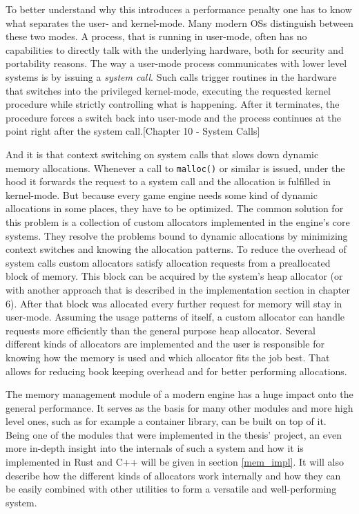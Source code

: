 To better understand why this introduces a performance penalty one has to know what separates the user- and kernel-mode. Many modern \acp{OS} distinguish between these two modes. A process, that is running in user-mode, often has no capabilities to directly talk with the underlying hardware, both for security and portability reasons. The way a user-mode process communicates with lower level systems is by issuing a \textit{system call}. Such calls trigger routines in the hardware that switches into the privileged kernel-mode, executing the requested kernel procedure while strictly controlling what is happening. After it terminates, the procedure forces a switch back into user-mode and the process continues at the point right after the system call.\cite{LinuxKernel}[Chapter 10 - System Calls]

And it is that context switching on system calls that slows down dynamic memory allocations. Whenever a call to \texttt{malloc()} or similar is issued, under the hood it forwards the request to a system call and the allocation is fulfilled in kernel-mode. But because every game engine needs some kind of dynamic allocations in some places, they have to be optimized. The common solution for this problem is a collection of custom allocators implemented in the engine's core systems. They resolve the problems bound to dynamic allocations by minimizing context switches and knowing the allocation patterns.
To reduce the overhead of system calls custom allocators satisfy allocation requests from a preallocated block of memory. This block can be acquired by the system's heap allocator (or with another approach that is described in the implementation section in chapter 6). After that block was allocated every further request for memory will stay in user-mode. Assuming the usage patterns of itself, a custom allocator can handle requests more efficiently than the general purpose heap allocator. Several different kinds of allocators are implemented and the user is responsible for knowing how the memory is used and which allocator fits the job best. That allows for reducing book keeping overhead and for better performing allocations.

The memory management module of a modern engine has a huge impact onto the general performance. It serves as the basis for many other modules and more high level ones, such as for example a container library, can be built on top of it. Being one of the modules that were implemented in the thesis' project, an even more in-depth insight into the internals of such a system and how it is implemented in Rust and C++ will be given in section \ref{mem_impl}. It will also describe how the different kinds of allocators work internally and how they can be easily combined with other utilities to form a versatile and well-performing system.

